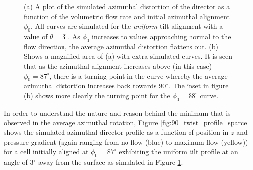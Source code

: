 \begin{figure}
\begin{center}
\end{center}
\caption[Simulated average director rotation for the uniform state]{\label{fig:90_vary_phi} (a) A plot of the simulated azimuthal distortion of the director as a function of the volumetric flow rate and initial azimuthal alignment $\phi_0$. All curves are simulated for the \textit{uniform} tilt alignment with a value of $\theta=3^{\circ}$. As $\phi_0$ increases to values approaching normal to the flow direction, the average azimuthal distortion flattens out. (b) Shows a magnified area of (a) with extra simulated curves. It is seen that as the azimuthal alignment increases above (in this case) $\phi_0=87^{\circ}$, there is a turning point in the curve whereby the average azimuthal distortion increases back towards $90^{\circ}$. The inset in figure (b) shows more clearly the turning point for the $\phi_0=88^{\circ}$ curve.}
\end{figure}

In order to understand the nature and reason behind the minimum that is observed in the average azimuthal rotation, Figure \ref{fig:90_twist_profile_sparce} shows the simulated azimuthal director profile as a function of position in $z$ and pressure gradient (again ranging from no flow (blue) to maximum flow (yellow)) for a cell initially aligned at $\phi_0=87^{\circ}$ exhibiting the uniform tilt profile at an angle of 3$^{\circ}$ away from the surface as simulated in Figure \ref{fig:90_vary_phi}.

